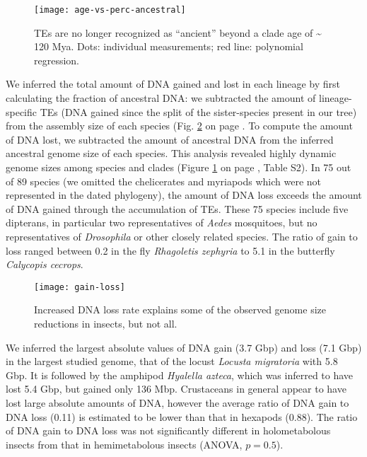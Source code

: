 \begin{figure}[h!]
\begin{center}
\texttt{[image: age-vs-perc-ancestral]}
\caption[TEs are no longer recognized as ``ancient'' beyond a clade age of
\textasciitilde{} 120 Mya]{{TEs are no longer recognized as ``ancient'' beyond a clade age of
\textasciitilde{} 120 Mya. Dots: individual measurements; red line:
polynomial regression.
{\label{fig:ancient-vs-clade-age}}%
}}
\end{center}
\end{figure}

We inferred the total amount of DNA gained and lost in each lineage by
first calculating the fraction of ancestral DNA: we subtracted the
amount of lineage-specific TEs (DNA gained since the split of the
sister-species present in our tree) from the assembly size of each
species (Fig. \ref{fig:gain-loss} on page \pageref{fig:gain-loss}. To compute the amount of DNA lost, we subtracted the amount of
ancestral DNA from the inferred ancestral genome size of each species.
This analysis revealed highly dynamic genome sizes among species and
clades (Figure \ref{fig:ancient-vs-clade-age} on page
\pageref{fig:ancient-vs-clade-age},
Table S2). In 75 out of 89 species (we omitted the
chelicerates and myriapods which were not represented in the dated
phylogeny), the amount of DNA loss exceeds the amount of DNA gained
through the accumulation of TEs. These 75 species include five
dipterans, in particular two representatives of \emph{Aedes} mosquitoes,
but no representatives of \emph{Drosophila} or other closely related
species. The ratio of gain to loss ranged between 0.2 in the fly
\emph{Rhagoletis zephyria} to 5.1 in the butterfly \emph{Calycopis
cecrops}.

\begin{figure}[h!]
\begin{center}
\texttt{[image: gain-loss]}
\caption[DNA gain and loss due to TE activity]{{Increased DNA loss rate explains some of the observed genome size
reductions in insects, but not all.
{\label{fig:gain-loss}}%
}}
\end{center}
\end{figure}

We inferred the largest absolute values of DNA gain (3.7 Gbp) and loss
(7.1 Gbp) in the largest studied genome, that of the locust
\emph{Locusta migratoria} with 5.8 Gbp. It is followed by the amphipod
\emph{Hyalella azteca}, which was inferred to have lost 5.4 Gbp, but
gained only 136 Mbp. Crustaceans in general appear to have lost large
absolute amounts of DNA, however the average ratio of DNA gain to DNA
loss (0.11) is estimated to be lower than that in hexapods (0.88). The
ratio of DNA gain to DNA loss was not significantly different in
holometabolous insects from that in hemimetabolous insects (ANOVA,
$p = 0.5$).

